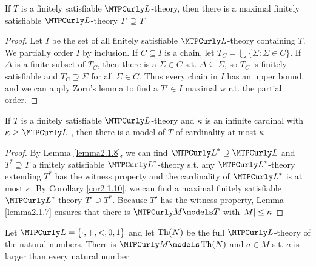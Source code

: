 \documentclass[11pt]{article}
\begin{document}
\begin{corollary}[]
\label{cor2.1.10}
If \(T\) is a finitely satisfiable \(\call\)-theory, then there is a maximal
finitely satisfiable \(\call\)-theory \(T'\supseteq T\)
\end{corollary}
\begin{proof}
Let \(I\) be the set of all finitely satisfiable \(\call\)-theory containing
\(T\). We partially order \(I\) by inclusion. If \(C\subseteq I\) is a chain, let
\(T_C=\bigcup\{\Sigma:\Sigma\in C\}\). If \(\Delta\) is a finite subset of
\(T_C\), then there is a \(\Sigma\in C\) s.t. \(\Delta\subseteq\Sigma\), so \(T_C\)
is finitely satisfiable and \(T_C\supseteq\Sigma\) for all \(\Sigma\in C\). Thus
every chain in \(I\) has an upper bound, and we can apply Zorn's lemma to find
a \(T'\in I\) maximal w.r.t. the partial order.
\end{proof}


\begin{theorem}
\label{thm2.1.11}
If \(T\) is a finitely satisfiable \(\call\)-theory and \(\kappa\) is an infinite
cardinal with \(\kappa\ge\abs{\call}\), then there is a model of \(T\) of
cardinality at most \(\kappa\)
\end{theorem}

\begin{proof}
By Lemma \ref{lemma2.1.8}, we can find \(\call^*\supseteq\call\) and 
\(T^*\supseteq T\) a finitely satisfiable \(\call^*\)-theory s.t. any
\(\call^*\)-theory extending \(T^*\) has the witness property and the
cardinality of \(\call^*\) is at most \(\kappa\). By Corollary \ref{cor2.1.10}, we can
find a maximal finitely satisfiable \(\call^*\)-theory 
\(T'\supseteq T^*\). Because \(T'\) has the witness property, Lemma
\ref{lemma2.1.7} ensures that there is \(\calm\models T\) with \(\abs{M}\le\kappa\)
\end{proof}

\begin{proposition}[]
Let \(\call=\{\cdot,+,<,0,1\}\) and let \(\operatorname{Th}(\relax{N})\) be the full \(\call\)-theory
of the natural numbers. There is \(\calm\models\Th(\N)\) and \(a\in M\) s.t. \(a\)
is larger than every natural number
\end{proposition}
\end{document}
